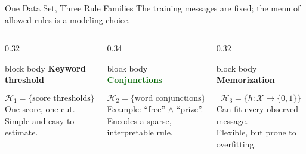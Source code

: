 \documentclass[aspectratio=169,10pt]{beamer}
\newcommand{\X}{\mathcal{X}}
\newcommand{\Hc}{\mathcal{H}}
\begin{document}
\begin{frame}[t]{One Data Set, Three Rule Families}
  \vspace{0.05cm}
  \centering
  {\normalsize The training messages are fixed; the menu of allowed rules is a modeling choice.}
  \vspace{0.16cm}
  \begin{columns}[T,totalwidth=\textwidth]
    \begin{column}{0.32\textwidth}
      \begin{beamercolorbox}[rounded=true,sep=0.20cm,wd=\linewidth]{block body}
        \centering
        {\bfseries\textcolor{deepblue}{Keyword threshold}}\par
        \vspace{0.12cm}
        \[
          \Hc_1=\{\text{score thresholds}\}
        \]
        \small One score, one cut.\\[0.08cm]
        Simple and easy to estimate.
      \end{beamercolorbox}
    \end{column}
    \begin{column}{0.34\textwidth}
      \begin{beamercolorbox}[rounded=true,sep=0.20cm,wd=\linewidth]{block body}
        \centering
        {\bfseries\textcolor{darkgreen}{Conjunctions}}\par
        \vspace{0.12cm}
        \[
          \Hc_2=\{\text{word conjunctions}\}
        \]
        \small Example: ``free'' $\land$ ``prize''.\\[0.08cm]
        Encodes a sparse, interpretable rule.
      \end{beamercolorbox}
    \end{column}
    \begin{column}{0.32\textwidth}
      \begin{beamercolorbox}[rounded=true,sep=0.20cm,wd=\linewidth]{block body}
        \centering
        {\bfseries\textcolor{slideorange}{Memorization}}\par
        \vspace{0.12cm}
        \[
          \Hc_3=\{h:\X\to\{0,1\}\}
        \]
        \small Can fit every observed message.\\[0.08cm]
        Flexible, but prone to overfitting.
      \end{beamercolorbox}

\end{column}
\end{columns}
\end{frame}
\end{document}
